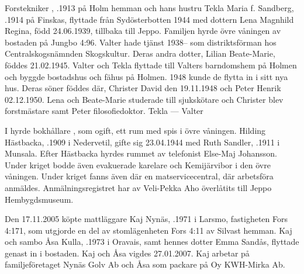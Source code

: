   Forstekniker , .1913 på Holm hemman och hans hustru Tekla Maria f. Sandberg, .1914 på Finskas, flyttade från Sydösterbotten 1944 med dottern Lena Magnhild Regina, född 24.06.1939, tillbaka till Jeppo. Familjen hyrde övre våningen av bostaden på Jungbo 4:96. Valter hade tjänst 1938-- som distriktsförman hos Centralskogsnämnden Skogskultur. Deras andra dotter, Lilian Beate-Marie, föddes 21.02.1945. Valter och Tekla flyttade till Valters barndomshem på Holmen och byggde bostadshus och fähus på Holmen. 1948 kunde de flytta in i sitt nya hus. Deras söner föddes där, Christer David den 19.11.1948 och Peter Henrik 02.12.1950. Lena och Beate-Marie studerade till sjukskötare och Christer blev forstmästare samt Peter filosofiedoktor.
Tekla   ---  Valter 

I  hyrde bokhållare , som ogift, ett rum med spis i övre våningen. Hilding Hästbacka, .1909 i Nedervetil, gifte sig 23.04.1944 med Ruth Sandler, .1911 i Munsala. Efter Hästbacka hyrdes rummet av telefonist Else-Maj Johansson. Under kriget bodde även evakuerade karelare och Kemijärvibor i den övre våningen. Under kriget fanns även där en matservicecentral, där arbetsföra anmäldes. Anmälningsregistret har av Veli-Pekka Aho överlåtits till Jeppo Hembygdsmuseum.






Den 17.11.2005 köpte mattläggare Kaj Nynäs, .1971 i Larsmo, fastigheten Fors 4:171, som utgjorde en del av stomlägenheten Fors 4:11 av Silvast hemman.  Kaj och sambo Åsa Kulla, .1973 i Oravais, samt hennes dotter Emma Sandås, flyttade genast in i bostaden. Kaj och Åsa vigdes 27.01.2007. Kaj arbetar på familjeföretaget Nynäs Golv Ab och Åsa som packare på Oy KWH-Mirka Ab.
\begin{jhchildren}
  \item {}
  \item {}
  \item {}
\end{jhchildren}

